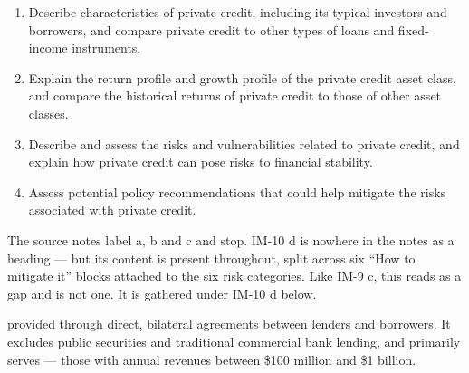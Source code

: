 

\begin{imkeybox}[title={The four objectives in this reading}]
\begin{enumerate}[label=\textbf{\alph*.}]
\item Describe characteristics of private credit, including its typical investors and borrowers, and compare private credit to other types of loans and fixed-income instruments.
\item Explain the return profile and growth profile of the private credit asset class, and compare the historical returns of private credit to those of other asset classes.
\item Describe and assess the risks and vulnerabilities related to private credit, and explain how private credit can pose risks to financial stability.
\item Assess potential policy recommendations that could help mitigate the risks associated with private credit.
\end{enumerate}
\end{imkeybox}

\begin{imtrapbox}[breakable=false,title={The second unlabelled objective}]
The source notes label a, b and c and stop. IM-10 d is nowhere in the notes as a
heading --- but its content is present throughout, split across six ``How to
mitigate it'' blocks attached to the six risk categories. Like IM-9 c, this reads
as a gap and is not one. It is gathered under IM-10 d below.
\end{imtrapbox}


\begin{imdefbox}[title={Private credit}]
 provided through direct, bilateral agreements
between lenders and borrowers. It excludes public securities and traditional
commercial bank lending, and primarily serves  ---
those with annual revenues between \$100 million and \$1 billion.
\end{imdefbox}

